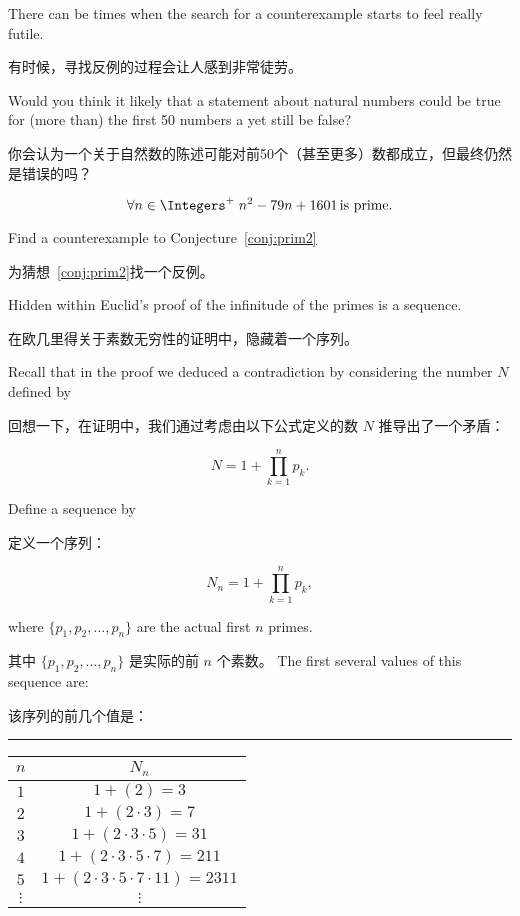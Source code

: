 There can be times when the search for a counterexample starts to feel
really futile.

有时候，寻找反例的过程会让人感到非常徒劳。

Would you think it likely that a statement about
natural numbers could be true for (more than) the first 50 numbers
a yet still be false?

你会认为一个关于自然数的陈述可能对前50个（甚至更多）数都成立，但最终仍然是错误的吗？

\begin{conj}
\label{conj:prim2}
\[ \forall n \in \Integers^+ \; n^2 - 79n + 1601 \, \mbox{is prime.} \]
\end{conj}

\begin{exer}
Find a counterexample to Conjecture~\ref{conj:prim2}

为猜想~\ref{conj:prim2}找一个反例。
\end{exer}

Hidden within Euclid's proof of the infinitude of the primes is
a sequence.

在欧几里得关于素数无穷性的证明中，隐藏着一个序列。

Recall that in the proof we deduced a contradiction
by considering the number $N$ defined by 

回想一下，在证明中，我们通过考虑由以下公式定义的数 $N$ 推导出了一个矛盾：

\[  N = 1 + \prod_{k=1}^n p_k.
\]

Define a sequence by

定义一个序列：

\[  N_n  = 1 + \prod_{k=1}^n p_k, \]

where $\{p_1, p_2, \ldots , p_n\}$ are the actual first $n$ primes.

其中 $\{p_1, p_2, \ldots , p_n\}$ 是实际的前 $n$ 个素数。
The first several values of this sequence are:

该序列的前几个值是：

\rule{72pt}{0pt} \begin{tabular}{c|c}
 $n$ & $N_n$ \\ \hline
 $1$ & $1+(2) = 3$ \\
 $2$ & $1+(2\cdot 3) = 7$\\
 $3$ & $1+(2\cdot 3\cdot 5) = 31$\\
 $4$ & $1+(2\cdot 3\cdot 5\cdot 7) = 211$\\
 $5$ & $1+(2\cdot 3\cdot 5\cdot 7\cdot 11) = 2311$\\
$\vdots$ & $\vdots$ \\
\end{tabular}

